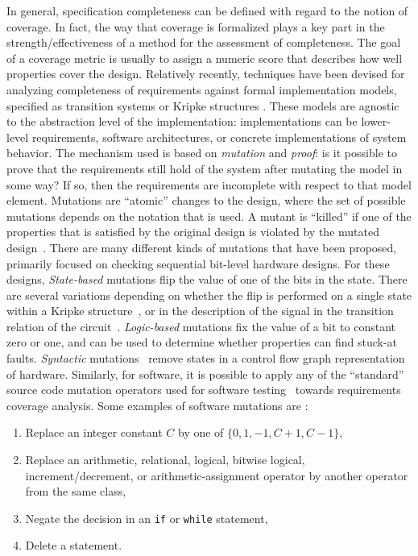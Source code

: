 In general, specification completeness can be defined with
regard to the notion of coverage. In fact, the way that coverage
is formalized plays a key part in the strength/effectiveness of
a method for the assessment of completeness. The goal of a coverage metric is usually to assign a numeric score that describes how well properties cover the design.
Relatively recently, techniques have been devised for analyzing completeness of requirements against formal implementation models, specified as transition systems or Kripke structures \cite{chockler2001practical,das2005formal, claessen2007coverage, grosse2007estimating}.  These models are agnostic to the abstraction level of the implementation: implementations can be lower-level requirements, software architectures, or concrete implementations of system behavior.  The mechanism used is based on {\em mutation} and {\em proof}: is it possible to prove that the requirements still hold of the system after mutating the model in some way?  If so, then the requirements are incomplete with respect to that model element. Mutations are ``atomic'' changes to the design, where the set of possible mutations depends on the notation that is used.  A mutant is ``killed'' if one of the properties that is satisfied by the original design is violated by the mutated design~\cite{chockler_coverage_2003,chockler2001practical,chockler2010coverage,Kupferman:2006:SCF,kupferman_theory_2008}.  There are many different kinds of mutations that have been proposed, primarily focused on checking sequential bit-level hardware designs.
For these designs, {\em State-based} mutations flip the value of one of the bits in the state.  There are several variations depending on whether the flip is performed on a single state within a Kripke structure~\cite{hoskote1999coverage}, or in the description of the signal in the transition relation of the circuit~\cite{chockler2001practical}.  {\em Logic-based} mutations fix the value of a bit to constant zero or one, and can be used to determine whether properties can find stuck-at faults.  {\em Syntactic} mutations~\cite{chockler_coverage_2003} remove states in a control flow graph representation of hardware.
Similarly, for software, it is possible to apply any of the ``standard'' source code mutation operators used for software testing~\cite{Andrews06:mutation} towards requirements coverage analysis.
Some examples of software mutations are \cite{Budd:1980}:
\begin{enumerate}
    \item Replace an integer constant $C$ by one of $\{0, 1, -1, C + 1, C - 1\}$,
    \item Replace an arithmetic, relational, logical, bitwise logical, increment/decrement, or arithmetic-assignment operator by another operator from the same class,
    \item Negate the decision in an \texttt{if} or \texttt{while} statement,
    \item Delete a statement.
\end{enumerate}


